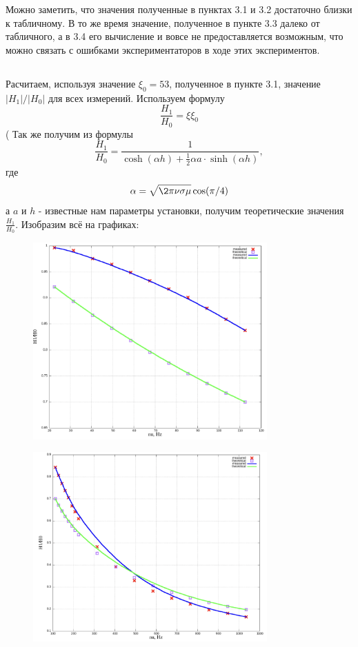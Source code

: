 \documentclass[11pt]{article}
\begin{document}
Можно заметить, что значения полученные в пунктах 3.1 и 3.2 достаточно близки к табличному.
В то же время значение, полученное в пункте 3.3 далеко от табличного, а в 3.4 его вычисление
и вовсе не предоставляется возможным, что можно связать с ошибками экспериментаторов в ходе этих экспериментов.

\subsection{}
Расчитаем, используя значение \(\xi_0 = 53\), полученное в пункте 3.1, значение \(|H_1|/|H_0|\) для всех измерений.
Используем формулу
\[\frac{H_1}{H_0} = \xi\xi_0\]
(
Так же получим из формулы
\[ \frac{H_1}{H_0} = \frac{1}{\cosh(\alpha h) + \frac{1}{2}\alpha a\cdot\sinh(\alpha h)}, \]
где 
\[ \alpha = \sqrt{\2\pi\nu\sigma\mu}\cos(\pi/4) \]
а \(a\) и \(h\) - известные нам параметры установки, получим теоретические значения \(\frac{H_1}{H_0}\). 
Изобразим всё на графиках:

\begin{figure}[H]
    \centering
    \includegraphics[width=0.8\textwidth]{H-low.png}
    \label{H-low}
\end{figure}

\begin{figure}[H]
    \centering
    \includegraphics[width=0.8\textwidth]{H-mid.png}
    \label{H-mid}
\end{figure}
\end{document}
